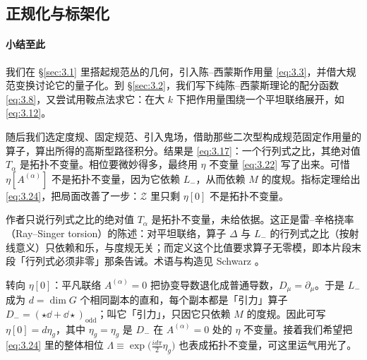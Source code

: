 
\subsection{正规化与标架化}\label{sec:3.3}

\paragraph{小结至此} 我们在 \S\ref{sec:3.1} 里搭起规范丛的几何，引入陈--西蒙斯作用量 \eqref{eq:3.3}，并借大规范变换讨论它的量子化。到 \S\ref{sec:3.2}，我们写下纯陈--西蒙斯理论的配分函数 \eqref{eq:3.8}，又尝试用鞍点法求它：在大 $k$ 下把作用量围绕一个平坦联络展开，如 \eqref{eq:3.12}。

随后我们选定度规、固定规范、引入鬼场，借助那些二次型构成规范固定作用量的算子，算出所得的高斯型路径积分。结果是 \eqref{eq:3.17}：一个行列式之比，其绝对值 $T_\alpha$ 是拓扑不变量。相位要微妙得多，最终用 $\eta$ 不变量 \eqref{eq:3.22} 写了出来。可惜 $\eta[A^{(\alpha)}]$ 不是拓扑不变量，因为它依赖 $L_-$，从而依赖 $M$ 的度规。指标定理给出 \eqref{eq:3.24}，把局面改善了一步：$\mathcal{Z}$ 里只剩 $\eta[0]$ 不是拓扑不变量。

\begin{yizhu}[含糊点]
作者只说行列式之比的绝对值 $T_\alpha$ 是拓扑不变量，未给依据。这正是雷–辛格挠率（Ray--Singer torsion）的陈述：对平坦联络，算子 $\Delta$ 与 $L_-$ 的行列式之比（按射线意义）只依赖和乐，与度规无关；而定义这个比值要求算子无零模，即本片段末段「行列式必须非零」那条告诫。术语与构造见 Schwarz \cite{schwarz1978}。
\end{yizhu}

转向 $\eta[0]$：平凡联络 $A^{(\alpha)}=0$ 把协变导数退化成普通导数，$D_\mu=\partial_\mu$。于是 $L_-$ 成为 $d=\dim G$ 个相同副本的直和，每个副本都是「引力」算子 $D_-=(\star\dd+\dd\star)_{\text{odd}}$；叫它「引力」，只因它只依赖 $M$ 的度规。因此可写 $\eta[0]=d\eta_g$，其中 $\eta_g=\eta_g$ 是 $D_-$ 在 $A^{(\alpha)}=0$ 处的 $\eta$ 不变量。接着我们希望把 \eqref{eq:3.24} 里的整体相位 $\Lambda\equiv\exp\bigl(\tfrac{id\pi}{2}\eta_g\bigr)$ 也表成拓扑不变量，可这里运气用光了。

